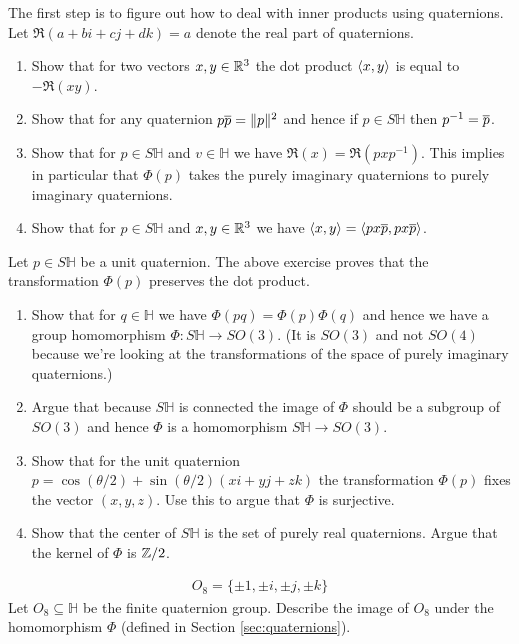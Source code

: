 \begin{exercise}
	The first step is to figure out how to deal with inner products using quaternions. Let $\Re(a + bi + cj + dk) = a$ denote the real part of quaternions.
	\begin{enumerate}
		\item Show that for two vectors $x, y \in \mathbb{R}^3$ the dot product $\langle x, y \rangle$ is equal to $-\Re(xy)$.
		\item Show that for any quaternion $p \overline{p} = \lVert p \rVert^2$ and hence if $p \in S\mathbb{H}$ then $p^{-1} = \overline{p}$.
		\item Show that for $p \in S \mathbb{H}$ and $v \in \mathbb{H}$ we have $ \Re{(x)} = \Re{(p x p^{-1}) }$. This implies in particular that $\Phi(p)$ takes the purely imaginary quaternions to purely imaginary quaternions.
		\item Show that for $p \in S \mathbb{H}$ and $x, y \in \mathbb{R}^3$ we have $ \langle x, y \rangle = \langle px\overline{p}, px\overline{p} \rangle$.
	\end{enumerate}
\end{exercise}

\begin{exercise}
	Let $p \in S \mathbb{H}$ be a unit quaternion. The above exercise proves that the transformation $\Phi(p)$ preserves the dot product.
	\begin{enumerate}
		\item Show that for $q \in \mathbb{H}$ we have $\Phi(pq) = \Phi(p)\Phi(q)$ and hence we have a group homomorphism $\Phi: S\mathbb{H}\rightarrow SO(3)$.
		      (It is $SO(3)$ and not $SO(4)$ because we're looking at the transformations of the space of purely imaginary quaternions.)
		\item Argue that because $S\mathbb{H}$ is connected the image of $\Phi$ should be a subgroup of $SO(3)$ and hence $\Phi$ is a homomorphism $S\mathbb{H} \rightarrow SO(3)$.
		\item Show that for the unit quaternion $p = \cos (\theta/2) + \sin (\theta/2)(x i+yj+zk)$ the transformation $\Phi(p)$ fixes the vector $(x,y,z)$. Use this to argue that $\Phi$ is surjective.
		\item Show that the center of $S\mathbb{H}$ is the set of purely real quaternions. Argue that the kernel of $\Phi$ is $\mathbb{Z}/2$.
	\end{enumerate}
\end{exercise}

\begin{exercise}
	\begin{align}
		O_8 = \{ \pm 1, \pm i, \pm j, \pm k \}
	\end{align}
	Let $O_8 \subseteq \mathbb{H}$ be the finite quaternion group. Describe the image of $O_8$ under the homomorphism $\Phi$ (defined in Section \ref{sec:quaternions}).
\end{exercise}










